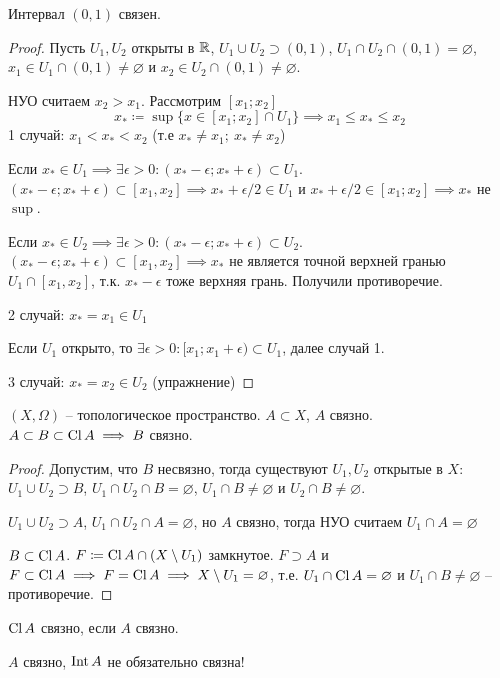 \documentclass[main]{subfiles}
\begin{document}
\begin{theorem}
    Интервал $(0,1)$ связен.
\end{theorem}
\begin{proof}
    Пусть $U_1, U_2$ открыты в $\mathbb{R}$, $U_1 \cup U_2 \supset (0,1)$, $U_1 \cap U_2 \cap (0,1) = \varnothing$,
    $x_1 \in U_1 \cap (0,1) \neq \varnothing$ и $x_2\in U_2 \cap (0,1) \neq \varnothing$.

    НУО считаем $x_2 > x_1$. Рассмотрим $[x_1; x_2]$
    \[x_* \coloneqq \sup \{x \in [x_1; x_2] \cap U_1\} \implies x_1 \le x_* \le x_2\]
    1 случай: $x_1 < x_* < x_2$ (т.е $x_* \neq x_1;\ x_* \neq x_2$)

    Если $x_* \in U_1 \implies \exists \epsilon >0 : (x_*-\epsilon; x_* + \epsilon) \subset U_1$.
    $(x_*-\epsilon; x_* + \epsilon) \subset [x_1, x_2] \implies x_* + \epsilon / 2 \in U_1$ и
    $x_* + \epsilon/2 \in [x_1; x_2] \implies x_*$ не $\sup$.

    Если $x_* \in U_2 \implies \exists \epsilon >0 : (x_*-\epsilon; x_* + \epsilon) \subset U_2$.
    $(x_*-\epsilon; x_* + \epsilon) \subset [x_1, x_2] \implies x_*$ не является точной верхней гранью
    $U_1 \cap [x_1, x_2]$, т.к. $x_* - \epsilon$ тоже верхняя грань. Получили противоречие.

    2 случай: $x_* = x_1 \in U_1$

    Если $U_1$ открыто, то $\exists \epsilon > 0 : [x_1; x_1 + \epsilon) \subset U_1$, далее случай 1.

    3 случай: $x_* = x_2 \in U_2$ (упражнение)
\end{proof}

\begin{theorem}
    $(X, \Omega)$ -- топологическое пространство. $A \subset X$, $A$ связно.
    $A \subset B \subset \operatorname{Cl} A \implies B$ связно.
\end{theorem}
\begin{proof}
    Допустим, что  $B$ несвязно, тогда существуют $U_1, U_2$ открытые в $X$:
    $U_1 \cup U_2 \supset B$, $U_1 \cap U_2 \cap B = \varnothing$,
    $U_1 \cap B \neq \varnothing$ и $U_2 \cap B \neq \varnothing$.

    $U_1 \cup U_2 \supset A$, $U_1 \cap U_2 \cap A = \varnothing$,
    но $A$ связно, тогда НУО считаем $U_1 \cap A = \varnothing$

    $B \subset \operatorname{Cl} A$. $F \coloneqq \operatorname{Cl} A \cap (X \setminus U_1)$ замкнутое.
    $F \supset A$ и $F \subset \operatorname{Cl} A \implies F = \operatorname{Cl} A \implies X \setminus U_1 = \varnothing$,
    т.е. $U_1 \cap \operatorname{Cl} A = \varnothing$ и $U_1 \cap B \neq \varnothing$ -- противоречие.
\end{proof}
\begin{corollary}
    $\operatorname{Cl} A$ связно, если $A$ связно.
\end{corollary}
\begin{remark}
    $A$ связно, $\operatorname{Int} A$ не обязательно связна!
\end{remark}
\end{document}
